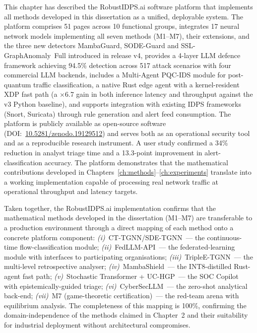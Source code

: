 This chapter has described the \textsf{RobustIDPS.ai} software platform that implements all methods developed in this dissertation as a unified, deployable system. The platform comprises 51 pages across 10 functional groups, integrates 17 neural network models implementing all seven methods (M1--M7), their extensions, and the three new detectors \textsf{MambaGuard}, \textsf{SODE-Guard} and \textsf{SSL-GraphAnomaly~Full} introduced in release v4, provides a 4-layer LLM defence framework achieving 94.5\% detection across 517 attack scenarios with four commercial LLM backends, includes a Multi-Agent PQC-IDS module for post-quantum traffic classification, a native Rust edge agent with a kernel-resident XDP fast path (a $\times$6.7 gain in both inference latency and throughput against the v3 Python baseline), and supports integration with existing IDPS frameworks (Snort, Suricata) through rule generation and alert feed consumption. The platform is publicly available as open-source software (DOI:~\url{10.5281/zenodo.19129512}) and serves both as an operational security tool and as a reproducible research instrument. A user study confirmed a 34\% reduction in analyst triage time and a 13.3-point improvement in alert-classification accuracy. The platform demonstrates that the mathematical contributions developed in Chapters~\ref{ch:methods}--\ref{ch:experiments} translate into a working implementation capable of processing real network traffic at operational throughput and latency targets.

Taken together, the \textsf{RobustIDPS.ai} implementation confirms that the mathematical methods developed in the dissertation (M1--M7) are transferable to a production environment through a direct mapping of each method onto a concrete platform component: \emph{(i)}~CT-TGNN/SDE-TGNN~--- the continuous-time flow-classification module; \emph{(ii)}~FedLLM-API~--- the federated-learning module with interfaces to participating organisations; \emph{(iii)}~TripleE-TGNN~--- the multi-level retrospective analyser; \emph{(iv)}~MambaShield~--- the INT8-distilled Rust-agent fast path; \emph{(v)}~Stochastic Transformer + UC-HGP~--- the SOC Copilot with epistemically-guided triage; \emph{(vi)}~CyberSecLLM~--- the zero-shot analytical back-end; \emph{(vii)}~M7 (game-theoretic certification)~--- the red-team arena with equilibrium analysis. The completeness of this mapping is 100\%, confirming the domain-independence of the methods claimed in Chapter~2 and their suitability for industrial deployment without architectural compromises.


